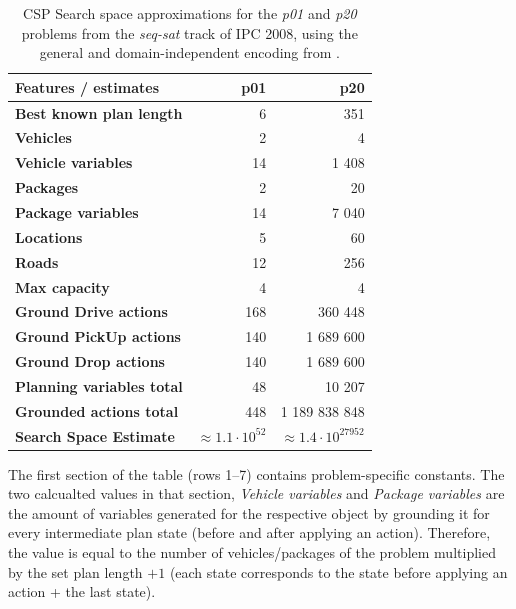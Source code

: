 \begin{table}[tb]
\begin{center}
\begin{tabular}{l||rr}
\textbf{Features / estimates} & \textbf{p01} & \textbf{p20} \\ 
\hline 
\hline 
\textbf{Best known plan length} & 6 & 351 \\ 
\textbf{Vehicles} & 2 & 4 \\ 
\textbf{Vehicle variables} & 14 & 1 408 \\ 
\textbf{Packages} & 2 & 20 \\ 
\textbf{Package variables} & 14 & 7 040 \\ 
\textbf{Locations} & 5 & 60 \\ 
\textbf{Roads} & 12 & 256 \\
\textbf{Max capacity} & 4 & 4 \\ 
\hline
\textbf{Ground Drive actions} & 168 & 360 448 \\ 
\textbf{Ground PickUp actions} & 140 & 1 689 600 \\ 
\textbf{Ground Drop actions} & 140 & 1 689 600 \\ 
\hline 
\textbf{Planning variables total} & 48 & 10 207 \\ 
\textbf{Grounded actions total} & 448 & 1 189 838 848 \\ 
\textbf{Search Space Estimate} & $\approx 1.1 \cdot 10^{52}$ & $\approx 1.4 \cdot 10^{27 952}$ \\ %
\end{tabular}
\end{center}
\caption[Search space approximations for a na{\"{i}}ve CSP encoding.]{CSP Search space approximations for the \textit{p01} and \textit{p20} problems from the \textit{seq-sat} track of IPC 2008, using the general and domain-independent encoding from \citet[Section~8.3]{Ghallab2004}.}
\label{tab:csp-trivial}
\end{table}

The first section of the table (rows 1--7) contains problem-specific constants.
The two calcualted values in that section, \textit{Vehicle variables} and \textit{Package variables} are the amount of variables generated for the respective
object by grounding it for every intermediate plan state (before and after applying an action). Therefore, the value is equal to the number of vehicles/packages of the problem
multiplied by the set plan length $+ 1$ (each state corresponds to the state before applying an action + the last state).

